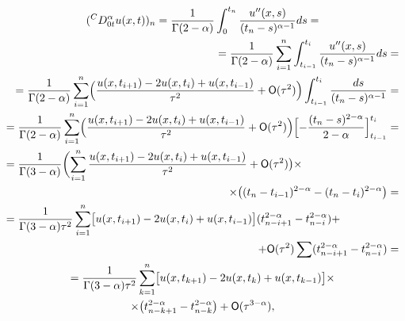 \begin{multline}

\label{mbeyb:eq1}

({}^C D_{0t}^\alpha u(x,t) )_n =

\frac{1}{\Gamma (2-\alpha  )}\int_0^{t_n } 

\frac{u''(x, s)}{(t_n -s)^{\alpha  -1}}ds= \\

\hfill =\frac{1}{\Gamma (2-\alpha )} \sum\limits_{i=1}^n 

\int_{t_{i-1} }^{t_i } \frac{u''(x,s)}{(t_n -s)^{\alpha -1}}ds= 

 \\ 

\hfill =\frac{1}{\Gamma (2-\alpha )}\sum\limits_{i=1}^n 

 \Bigl( \frac{u(x,t_{i+1}  )-2u(x,t_i )+u(x,t_{i-1} )}{\tau ^2}+{\sf O}(\tau ^2) \Bigr)

\int_{t_{i-1} }^{t_i } \frac{ds}{(t_n -s)^{\alpha -1}} = 

\\ 

\hfill =\frac{1}{\Gamma (2-\alpha )}\sum\limits_{i=1}^n 

 \Bigl( \frac{u(x,t_{i+1}  )-2u(x,t_i )+u(x,t_{i-1} )}{\tau ^2}+{\sf O}(\tau ^2) \Bigr) 

 \Bigl[ -\frac{(t_n -s)^{2-\alpha }}{2-\alpha }  \Bigr]_{t_{i-1} }^{t_i }  = 

 \\ 

 =\frac{1}{\Gamma (3-\alpha )}

 \biggl( 

 \sum\limits_{i=1}^n \frac{ u(x,t_{i+1}  )- 2u(x,t_i )+u(x,t_{i-1} )}{\tau ^2}+{\sf O}(\tau ^2)  \bigr) \times \hfill 

 \\

\hfill \times \bigl( ( t_n -t_{i-1} )^{2-\alpha }-(t_n -t_i )^{2-\alpha } \bigr)= \\ 

 =\frac{1}{\Gamma (3-\alpha )\tau ^2}

 \sum\limits_{i=1}^n \bigl[ 

u(x,t_{i+1} )-2u(x,t_i )+u(x,t_{i-1} ) \bigr] ( t_{n-i+1}^{2-\alpha } -t_{n-i}^{2-\alpha } ) + \hfill

\\

\hfill  +{\sf O}( \tau ^2)\sum\limits ( t_{n-i+1}^{2-\alpha } -t_{n-i}^{2-\alpha } )= \\ 

 =\frac{1}{\Gamma (3-\alpha )\tau ^2}

 \sum\limits_{k=1}^n 

 \bigl[ 

u(x,t_{k+1} )-2u(x,t_k )+u(x,t_{k-1} ) \bigr] \times \\

\times

\bigl( 

t_{n-k+1}^{2-\alpha } -t_{n-k}^{2-\alpha }  \bigr)+ {\sf O}( \tau ^{3-\alpha }),  

\end{multline}

